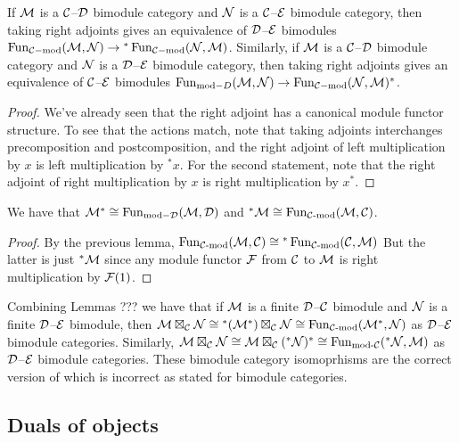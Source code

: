 \documentclass{amsart}
\begin{document}
\begin{lemma}
If $\mathcal M$ is a $\mathcal C$--$\mathcal D$ bimodule category and $\mathcal N$ is a $\mathcal C$--$\mathcal E$ bimodule category, then taking right adjoints gives an equivalence of $\mathcal D$--$\mathcal E$ bimodules $\operatorname{Fun}_{\mathcal C-\text{mod}}(\mathcal M, \mathcal N) \rightarrow {}^*\operatorname{Fun}_{\mathcal C-\text{mod}}(\mathcal N, \mathcal M)$.  Similarly, if $\mathcal M$ is a $\mathcal C$--$\mathcal D$ bimodule category and $\mathcal N$ is a $\mathcal D$--$\mathcal E$ bimodule category, then taking right adjoints gives an equivalence of $\mathcal C$--$\mathcal E$ bimodules $\operatorname{Fun}_{\text{mod}-D}(\mathcal M, \mathcal N) \rightarrow \operatorname{Fun}_{\mathcal C-\text{mod}}(\mathcal N, \mathcal M)^*$. 
\end{lemma}
\begin{proof}
We've already seen that the right adjoint has a canonical module functor structure.  To see that the actions match, note that taking adjoints interchanges precomposition and postcomposition, and the right adjoint of left multiplication by $x$ is left multiplication by ${}^*x$.  For the second statement, note that the right adjoint of right multiplication by $x$ is right multiplication by $x^*$.
\end{proof}

\begin{lemma} \label{lem:dual-formula-for-adjoints}
We have that $\mathcal M^* \cong \operatorname{Fun}_{\text{mod}-\mathcal D}(\mathcal M, \mathcal D)$ and ${}^*\mathcal M \cong \operatorname{Fun}_{\mathcal C\text{-mod}}(\mathcal M, \mathcal C)$.
\end{lemma}
\begin{proof}
By the previous lemma, $\operatorname{Fun}_{\mathcal C\text{-mod}}(\mathcal M, \mathcal C) \cong {}^*\operatorname{Fun}_{\mathcal C\text{-mod}}(\mathcal C, \mathcal M)$  But the latter is just ${}^*\mathcal M$ since any module functor $\mathcal F$ from $\mathcal C$ to $\mathcal M$ is right multiplication by $\mathcal F(1)$.
\end{proof}

\begin{remark}
Combining Lemmas ??? we have that if $\mathcal M$ is a finite $\mathcal D$--$\mathcal C$ bimodule and $\mathcal N$ is a finite $\mathcal D$--$\mathcal E$ bimodule, then $\mathcal M \boxtimes_\mathcal C \mathcal N \cong {}^*(\mathcal M^*) \boxtimes_\mathcal C \mathcal N \cong \operatorname{Fun}_{\mathcal C\text{-mod}}(\mathcal M^*,\mathcal N)$ as $\mathcal D$--$\mathcal E$ bimodule categories.   Similarly, $\mathcal M \boxtimes_\mathcal C \mathcal N \cong \mathcal M \boxtimes_\mathcal C ({}^*\mathcal N)^* \cong \operatorname{Fun}_{\text{mod-}\mathcal C}({}^*\mathcal N,\mathcal M)$ as $\mathcal D$--$\mathcal E$ bimodule categories.  These bimodule category isomoprhisms are the correct version of \cite{???} which is incorrect as stated for bimodule categories.
\end{remark}

\subsection{Duals of objects} \label{sec-df-objects}
\end{document}
